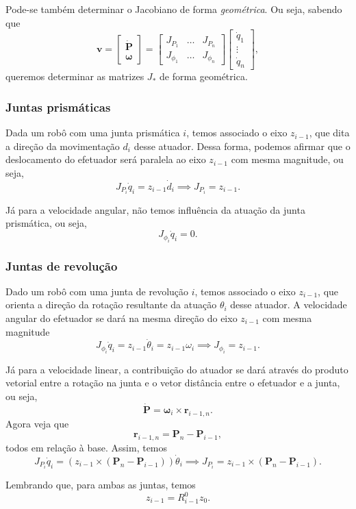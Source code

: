 
Pode-se também determinar o Jacobiano de forma \emph{geométrica}. Ou seja, sabendo que \[
\bm{v}=\begin{bmatrix} \bm{\dot{P}} \\ \bm{\omega} \end{bmatrix} = \begin{bmatrix} J_{P_1} & \ldots & J_{P_n} \\ J_{\phi_1} & \ldots & J_{\phi_n} \end{bmatrix} \begin{bmatrix} \dot{q}_1 \\ \vdots \\ \dot{q}_n \end{bmatrix} 
,\] queremos determinar as matrizes $J_*$ de forma geométrica.

\subsubsection*{Juntas prismáticas}

Dada um robô com uma junta prismática $i$, temos associado o eixo $z_{i-1}$, que dita a direção da movimentação $d_i$ desse atuador. Dessa forma, podemos afirmar que o deslocamento do efetuador será paralela ao eixo $z_{i-1}$ com mesma magnitude, ou seja, \[
J_{P_i}\dot{q}_i = z_{i-1}\dot{d}_i \implies J_{P_i} = z_{i-1}
.\]

Já para a velocidade angular, não temos influência da atuação da junta prismática, ou seja, \[
J_{\phi_i}\dot{q}_i = 0
.\] 

\subsubsection*{Juntas de revolução}

Dado um robô com uma junta de revolução $i$, temos associado o eixo $z_{i-1}$, que orienta a direção da rotação resultante da atuação $\theta_i$ desse atuador. A velocidade angular do efetuador se dará na mesma direção do eixo $z_{i-1}$ com mesma magnitude \[
J_{\phi_i}\dot{q}_i = z_{i-1}\dot{\theta}_i = z_{i-1}\omega_i \implies J_{\phi_i} = z_{i-1}
.\] 

Já para a velocidade linear, a contribuição do atuador se dará através do produto vetorial entre a rotação na junta e o vetor distância entre o efetuador e a junta, ou seja, \[
\bm{\dot{P}} = \bm{\omega}_i \times \bm{r}_{i-1,n}
.\] Agora veja que \[
\bm{r}_{i-1,n} = \bm{P}_n - \bm{P}_{i-1}
,\] todos em relação à base. Assim, temos \[
J_{P_i}\dot{q}_i = \left( z_{i-1}\times \left( \bm{P}_n - \bm{P}_{i-1} \right)  \right) \dot{\theta}_i \implies J_{P_i} = z_{i-1}\times \left( \bm{P}_n - \bm{P}_{i-1} \right)
.\] 


\begin{note}
    Lembrando que, para ambas as juntas, temos \[
    z_{i-1} = R_{i-1}^{0}z_0
    .\] 
\end{note}


